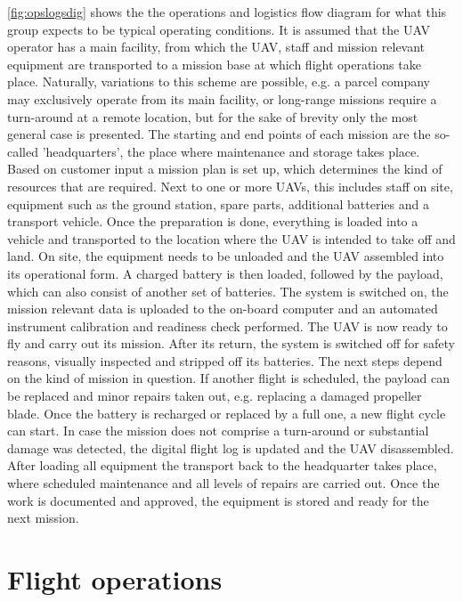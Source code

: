 \autoref{fig:opslogsdig} shows the the operations and logistics flow diagram for what this group expects to be typical operating conditions. It is assumed that the UAV operator has a main facility, from which the UAV, staff and mission relevant equipment are transported to a mission base at which flight operations take place. Naturally, variations to this scheme are possible, e.g. a parcel company may exclusively operate from its main facility, or long-range missions require a turn-around at a remote location, but for the sake of brevity only the most general case is presented.
The starting and end points of each mission are the so-called 'headquarters', the place where maintenance and storage takes place. Based on customer input a mission plan is set up, which determines the kind of resources that are required. Next to one or more UAVs, this includes staff on site, equipment such as the ground station, spare parts, additional batteries and a transport vehicle. Once the preparation is done, everything is loaded into a vehicle and transported to the location where the UAV is intended to take off and land. On site, the equipment needs to be unloaded and the UAV assembled into its operational form. A charged battery is then loaded, followed by the payload, which can also consist of another set of batteries. The system is switched on, the mission relevant data is uploaded to the on-board computer and an automated instrument calibration and readiness check performed. The UAV is now ready to fly and carry out its mission. After its return, the system is switched off for safety reasons, visually inspected and stripped off its batteries. The next steps depend on the kind of mission in question. If another flight is scheduled, the payload can be replaced and minor repairs taken out, e.g. replacing a damaged propeller blade. Once the battery is recharged or replaced by a full one, a new flight cycle can start. In case the mission does not comprise a turn-around or substantial damage was detected, the digital flight log is updated and the UAV disassembled. After loading all equipment the transport back to the headquarter takes place, where scheduled maintenance and all levels of repairs are carried out. Once the work is documented and approved, the equipment is stored and ready for the next mission. 


\section{Flight operations}

